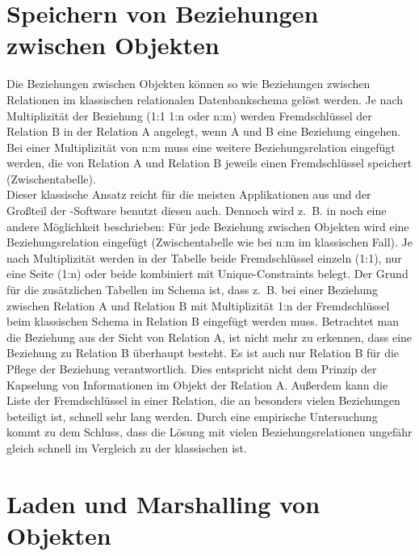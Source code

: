 \section{Speichern von Beziehungen zwischen Objekten} \label{orm-beziehungen}

Die Beziehungen zwischen Objekten können so wie Beziehungen zwischen Relationen im klassischen relationalen Datenbankschema gelöst werden. Je nach Multiplizität der Beziehung (1:1 1:n oder n:m) werden Fremdschlüssel der Relation B in der Relation A angelegt, wenn A und B eine Beziehung eingehen. Bei einer Multiplizität von n:m muss eine weitere Beziehungsrelation eingefügt werden, die von Relation A und Relation B jeweils einen Fremdschlüssel speichert (Zwischentabelle). \\
Dieser klassische Ansatz reicht für die meisten Applikationen aus und der Großteil der \ORM-Software benutzt diesen auch. Dennoch wird z.~B. in \cite{lodhi-ghazali} noch eine andere Möglichkeit beschrieben: Für jede Beziehung zwischen Objekten wird eine Beziehungsrelation eingefügt (Zwischentabelle wie bei n:m im klassischen Fall). Je nach Multiplizität werden in der Tabelle beide Fremdschlüssel einzeln (1:1), nur eine Seite (1:n) oder beide kombiniert mit Unique-Constraints belegt. Der Grund für die zusätzlichen Tabellen im Schema ist, dass z.~B. bei einer Beziehung zwischen Relation A und Relation B mit Multiplizität 1:n der Fremdschlüssel beim klassischen Schema in Relation B eingefügt werden muss. Betrachtet man die Beziehung aus der Sicht von Relation A, ist nicht mehr zu erkennen, dass eine Beziehung zu Relation B überhaupt besteht. Es ist auch nur Relation B für die Pflege der Beziehung verantwortlich. Dies entspricht nicht dem Prinzip der Kapselung von Informationen im Objekt der Relation A. Außerdem kann die Liste der Fremdschlüssel in einer Relation, die an besonders vielen Beziehungen beteiligt ist, schnell sehr lang werden. Durch eine empirische Untersuchung kommt \cite{lodhi-ghazali} zu dem Schluss, dass die Lösung mit vielen Beziehungsrelationen ungefähr gleich schnell im Vergleich zu der klassischen ist.

\section{Laden und Marshalling von Objekten} \label{marshalling}

